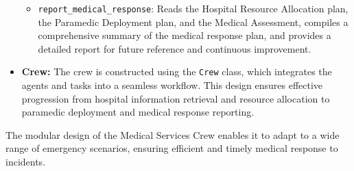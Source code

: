 \begin{itemize}
\begin{itemize}
        \item \texttt{report\_medical\_response}: Reads the Hospital Resource Allocation plan, the Paramedic Deployment plan, and the Medical Assessment, compiles a comprehensive summary of the medical response plan, and provides a detailed report for future reference and continuous improvement.
    \end{itemize}
    \item \textbf{Crew:}
    The crew is constructed using the \texttt{Crew} class, which integrates the agents and tasks into a seamless workflow. This design ensures effective progression from hospital information retrieval and resource allocation to paramedic deployment and medical response reporting.
\end{itemize}
The modular design of the Medical Services Crew enables it to adapt to a wide range of emergency scenarios, ensuring efficient and timely medical response to incidents.

